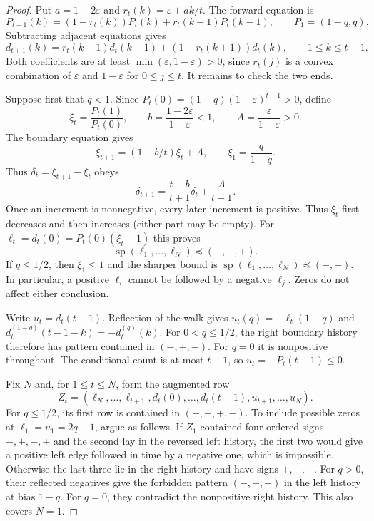 \begin{proof}
Put $a=1-2\varepsilon$ and $r_t(k)=\varepsilon+ak/t$. The forward equation
is
\[
 P_{t+1}(k)=(1-r_t(k))P_t(k)+r_t(k-1)P_t(k-1),
 \qquad P_1=(1-q,q).
\]
Subtracting adjacent equations gives
\begin{equation}\label{eq:bias-first-diff}
 d_{t+1}(k)=r_t(k-1)d_t(k-1)+(1-r_t(k+1))d_t(k),
 \qquad 1\le k\le t-1.
\end{equation}
Both coefficients are at least $\min(\varepsilon,1-\varepsilon)>0$,
since $r_t(j)$ is a convex combination of $\varepsilon$ and
$1-\varepsilon$ for $0\le j\le t$. It remains to check the two ends.

Suppose first that $q<1$. Since
$P_t(0)=(1-q)(1-\varepsilon)^{t-1}>0$, define
\[
 \xi_t=\frac{P_t(1)}{P_t(0)},\qquad
 b=\frac{1-2\varepsilon}{1-\varepsilon}<1,\qquad
 A=\frac{\varepsilon}{1-\varepsilon}>0.
\]
The boundary equation gives
\[
 \xi_{t+1}=(1-b/t)\xi_t+A,\qquad \xi_1=\frac q{1-q}.
\]
Thus $\delta_t=\xi_{t+1}-\xi_t$ obeys
\begin{equation}\label{eq:bias-edge-increments}
 \delta_{t+1}=\frac{t-b}{t+1}\delta_t+\frac A{t+1}.
\end{equation}
Once an increment is nonnegative, every later increment is positive.
Thus $\xi_t$ first decreases and then increases (either part may be empty). For $\ell_t=d_t(0)=P_t(0)(\xi_t-1)$ this proves
\[
 \operatorname{sp}(\ell_1,\ldots,\ell_N)\preceq(+,-,+).
\]
If $q\le1/2$, then $\xi_1\le1$ and the sharper bound is
$\operatorname{sp}(\ell_1,\ldots,\ell_N)\preceq(-,+)$.
In particular, a positive $\ell_i$ cannot be followed by a negative
$\ell_j$. Zeros do not affect either conclusion.

Write $u_t=d_t(t-1)$. Reflection of the walk gives
$u_t(q)=-\ell_t(1-q)$ and
$d_t^{(1-q)}(t-1-k)=-d_t^{(q)}(k)$.
For $0<q\le1/2$, the right boundary history therefore has pattern
contained in $(-,+,-)$. For $q=0$ it is nonpositive throughout. The conditional count is at
most $t-1$, so $u_t=-P_t(t-1)\le0$.

Fix $N$ and, for $1\le t\le N$, form the augmented row
\[
 Z_t=(\ell_N,\ldots,\ell_{t+1},
       d_t(0),\ldots,d_t(t-1),
       u_{t+1},\ldots,u_N).
\]
For $q\le1/2$, its first row is contained in $(+,-,+,-)$.
To include possible zeros at $\ell_1=u_1=2q-1$, argue as follows. If $Z_1$ contained four ordered signs $-,+,-,+$
and the second lay in the reversed left history, the first two would give
a positive left edge followed in time by a negative one, which is
impossible. Otherwise the last three lie in the right history and have
signs $+,-,+$. For $q>0$, their reflected negatives give the forbidden pattern
$(-,+,-)$ in the left history at bias $1-q$. For $q=0$, they contradict
the nonpositive right history. This also covers $N=1$.


\end{proof}
